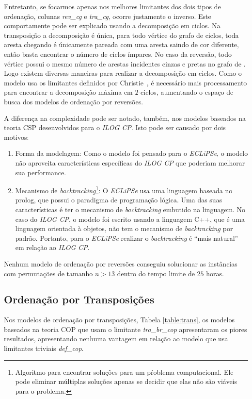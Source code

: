 Entretanto, se focarmos apenas nos melhores limitantes dos dois tipos
de ordenação, colunas \textit{rev\_cg} e \textit{tra\_cg}, ocorre
justamente o inverso. Este comportamente pode ser explicado usando a
decomposição em ciclos. Na transposição a decomposição é única, para
todo vértice do grafo de ciclos, toda aresta chegando é únicamente
pareada com uma aresta saindo de cor diferente, então basta encontrar
o número de ciclos ímpares. No caso da reversão, todo vértice possui o
mesmo número de arestas incidentes cinzas e pretas no grafo
de \bkp{}. Logo existem diversas maneiras para realizar a decomposição
em ciclos. Como o modelo usa os limitantes definidos por
Christie~\cite{Christie*1998}, é necessário mais processamento
para encontrar a decomposição máxima em $2$-ciclos, aumentando o
espaço de busca dos modelos de ordenação por reversões.

A diferença na complexidade pode ser notado, também, nos modelos
baseados na teoria CSP desenvolvidos para o \textit{ILOG CP}. Isto
pode ser causado por dois motivos:
\begin{enumerate}

  \item{Forma da modelagem: Como o modelo foi pensado para
  o \textit{ECLiPSe}, o modelo não aproveita características
  específicas do \textit{ILOG CP} que poderiam melhorar sua
  performance.}

  \item{Mecanismo de \textit{backtracking}\footnote{Algoritmo para
  encontrar soluções para um pŕoblema computacional. Ele pode eliminar
  múltiplas soluções apenas se decidir que elas não são viáveis para o
  problema.}: O \textit{ECLiPSe} usa uma linguagem baseada no prolog,
  que possui o paradigma de programação lógica. Uma das suas
  características é ter o mecanismo de \textit{backtracking} embutido
  na linguagem. No caso do \textit{ILOG CP}, o modelo foi escrito
  usando a linguagem C++, que é uma linguagem orientada à objetos, não
  tem o mecanismo de \textit{backtracking} por padrão. Portanto, para
  o \textit{ECLiPSe} realizar o \textit{backtracking} é ``mais
  natural'' em relação ao \textit{ILOG CP}.}

\end{enumerate}

Nenhum modelo de ordenação por reversões conseguiu solucionar as
instâncias com permutações de tamanho $n > 13$ dentro do tempo limite
de $25$ horas.



\subsection{Ordenação por Transposições}
\label{subsec:analise_tra}
Nos modelos de ordenação por transposições, Tabela \ref{table:trans},
os modelos baseados na teoria COP que usam o
limitante \textit{tra\_br\_cop} apresentaram os piores resultados,
apresentando nenhuma vantagem em relação ao modelo que usa limitantes
triviais \textit{def\_cop}.

